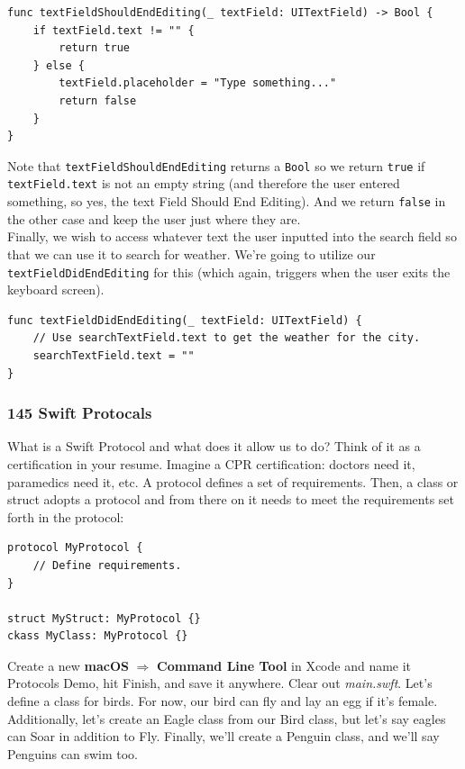 \documentclass[11pt, letterpaper]{article}
\begin{document}
\begin{verbatim}
func textFieldShouldEndEditing(_ textField: UITextField) -> Bool {
    if textField.text != "" {
        return true
    } else {
        textField.placeholder = "Type something..."
        return false
    }
}
\end{verbatim}

Note that \verb+textFieldShouldEndEditing+ returns a \verb+Bool+ so we return \verb+true+ if 
\newline \verb+textField.text+ is not an empty string (and therefore the user entered something, so yes, 
the text Field Should End Editing). And we return \verb+false+ in the other case and keep the user just where they are. \\

Finally, we wish to access whatever text the user inputted into the search field so that we can use it to search for
weather. We're going to utilize our \newline \verb+textFieldDidEndEditing+ for this (which again, triggers when the user exits
the keyboard screen).

\begin{verbatim}
func textFieldDidEndEditing(_ textField: UITextField) {
    // Use searchTextField.text to get the weather for the city.
    searchTextField.text = ""
}
\end{verbatim}


\subsubsection*{145 Swift Protocals}

What is a Swift Protocol and what does it allow us to do? Think of it as a certification in your resume. Imagine a 
CPR certification: doctors need it, paramedics need it, etc. A protocol defines a set of requirements. Then, a 
class or struct adopts a protocol and from there on it needs to meet the requirements set forth in the protocol:

\begin{verbatim}
protocol MyProtocol {
    // Define requirements.
}

struct MyStruct: MyProtocol {}
ckass MyClass: MyProtocol {}
\end{verbatim}

Create a new \textbf{macOS} $\Rightarrow$ \textbf{Command Line Tool} in Xcode and name it Protocols Demo, hit Finish,
and save it anywhere. Clear out \emph{main.swft}. Let's define a class for birds. For now, our bird can fly and lay
an egg if it's female. Additionally, let's create an Eagle class from our Bird class, but let's say eagles can Soar
in addition to Fly. Finally, we'll create a Penguin class, and we'll say Penguins can swim too.
\end{document}
